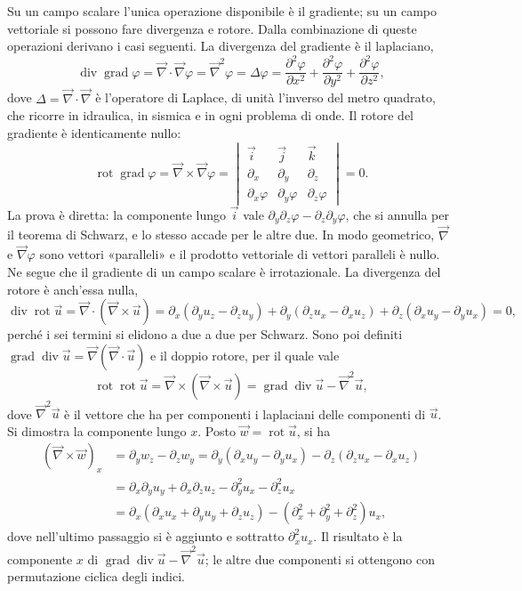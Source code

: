 \documentclass[11pt,a4paper]{article}
\newcommand{\nab}{\vec{\nabla}}
\DeclareMathOperator{\grad}{grad}
\DeclareMathOperator{\Div}{div}
\DeclareMathOperator{\rot}{rot}
\begin{document}
Su un campo scalare l'unica operazione disponibile è il gradiente; su un campo vettoriale si possono fare divergenza e rotore. Dalla combinazione di queste operazioni derivano i casi seguenti. La divergenza del gradiente è il laplaciano,
\[
\Div\grad\varphi=\nab\cdot\nab\varphi=\nab^2\varphi=\Delta\varphi=\frac{\partial^2\varphi}{\partial x^2}+\frac{\partial^2\varphi}{\partial y^2}+\frac{\partial^2\varphi}{\partial z^2},
\]
dove $\Delta=\nab\cdot\nab$ è l'operatore di Laplace, di unità l'inverso del metro quadrato, che ricorre in idraulica, in sismica e in ogni problema di onde. Il rotore del gradiente è identicamente nullo:
\[
\rot\grad\varphi=\nab\times\nab\varphi=\begin{vmatrix}\vec i&\vec j&\vec k\\[2pt]\partial_x&\partial_y&\partial_z\\[2pt]\partial_x\varphi&\partial_y\varphi&\partial_z\varphi\end{vmatrix}=0 .
\]
La prova è diretta: la componente lungo $\vec i$ vale $\partial_y\partial_z\varphi-\partial_z\partial_y\varphi$, che si annulla per il teorema di Schwarz, e lo stesso accade per le altre due. In modo geometrico, $\nab$ e $\nab\varphi$ sono vettori «paralleli» e il prodotto vettoriale di vettori paralleli è nullo. Ne segue che il gradiente di un campo scalare è irrotazionale. La divergenza del rotore è anch'essa nulla,
\[
\Div\rot\vec u=\nab\cdot(\nab\times\vec u)=\partial_x(\partial_yu_z-\partial_zu_y)+\partial_y(\partial_zu_x-\partial_xu_z)+\partial_z(\partial_xu_y-\partial_yu_x)=0 ,
\]
perché i sei termini si elidono a due a due per Schwarz. Sono poi definiti $\grad\Div\vec u=\nab(\nab\cdot\vec u)$ e il doppio rotore, per il quale vale
\[
\rot\rot\vec u=\nab\times(\nab\times\vec u)=\grad\Div\vec u-\nab^2\vec u ,
\]
dove $\nab^2\vec u$ è il vettore che ha per componenti i laplaciani delle componenti di $\vec u$. Si dimostra la componente lungo $x$. Posto $\vec w=\rot\vec u$, si ha
\begin{align*}
(\nab\times\vec w)_x&=\partial_yw_z-\partial_zw_y=\partial_y(\partial_xu_y-\partial_yu_x)-\partial_z(\partial_zu_x-\partial_xu_z)\\
&=\partial_x\partial_yu_y+\partial_x\partial_zu_z-\partial_y^2u_x-\partial_z^2u_x\\
&=\partial_x(\partial_xu_x+\partial_yu_y+\partial_zu_z)-(\partial_x^2+\partial_y^2+\partial_z^2)u_x ,
\end{align*}
dove nell'ultimo passaggio si è aggiunto e sottratto $\partial_x^2u_x$. Il risultato è la componente $x$ di $\grad\Div\vec u-\nab^2\vec u$; le altre due componenti si ottengono con permutazione ciclica degli indici.
\end{document}
